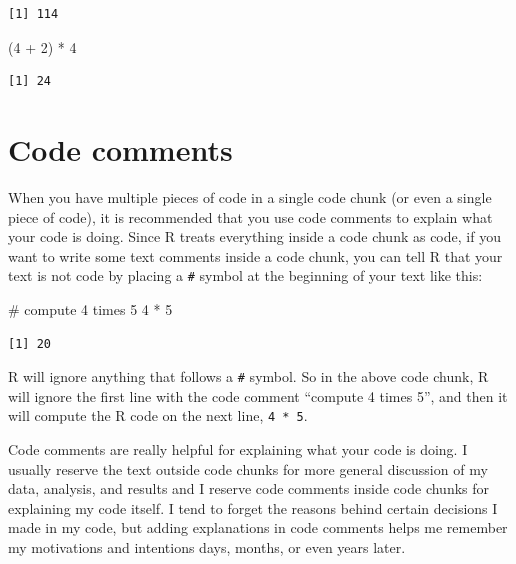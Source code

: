 \documentclass[
  letterpaper,
  DIV=11,
  numbers=noendperiod]{scrreprt}
\newenvironment{Shaded}{\begin{snugshade}}{\end{snugshade}}
\newcommand{\CommentTok}[1]{\textcolor[rgb]{0.37,0.37,0.37}{#1}}
\newcommand{\DecValTok}[1]{\textcolor[rgb]{0.68,0.00,0.00}{#1}}
\newcommand{\NormalTok}[1]{\textcolor[rgb]{0.00,0.23,0.31}{#1}}
\newcommand{\SpecialCharTok}[1]{\textcolor[rgb]{0.37,0.37,0.37}{#1}}
\begin{document}
\begin{verbatim}
[1] 114
\end{verbatim}

\begin{Shaded}
\begin{Highlighting}[]
\NormalTok{(}\DecValTok{4} \SpecialCharTok{+} \DecValTok{2}\NormalTok{) }\SpecialCharTok{*} \DecValTok{4}
\end{Highlighting}
\end{Shaded}

\begin{verbatim}
[1] 24
\end{verbatim}

\section{Code comments}\label{code-comments}

When you have multiple pieces of code in a single code chunk (or even a
single piece of code), it is recommended that you use code comments to
explain what your code is doing. Since R treats everything inside a code
chunk as code, if you want to write some text comments inside a code
chunk, you can tell R that your text is not code by placing a
\texttt{\#} symbol at the beginning of your text like this:

\begin{Shaded}
\begin{Highlighting}[]
\CommentTok{\# compute 4 times 5}
\DecValTok{4} \SpecialCharTok{*} \DecValTok{5}
\end{Highlighting}
\end{Shaded}

\begin{verbatim}
[1] 20
\end{verbatim}

R will ignore anything that follows a \texttt{\#} symbol. So in the
above code chunk, R will ignore the first line with the code comment
``compute 4 times 5'', and then it will compute the R code on the next
line, \texttt{4\ *\ 5}.

Code comments are really helpful for explaining what your code is doing.
I usually reserve the text outside code chunks for more general
discussion of my data, analysis, and results and I reserve code comments
inside code chunks for explaining my code itself. I tend to forget the
reasons behind certain decisions I made in my code, but adding
explanations in code comments helps me remember my motivations and
intentions days, months, or even years later.
\end{document}
